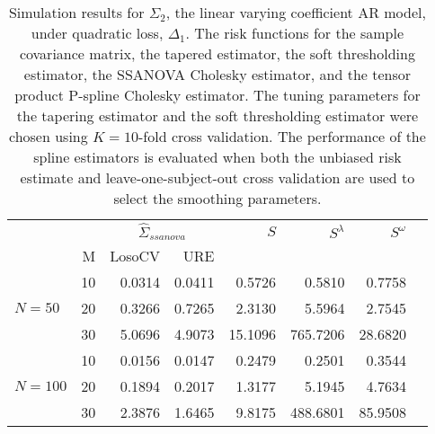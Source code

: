\documentclass[12pt]{article}
\theoremstyle{definition}
\begin{document}

\begin{table}[H]
\centering
\caption{Simulation results for $\Sigma_2$, the  linear varying coefficient AR model, under quadratic loss, $\Delta_1$. The risk functions for the sample covariance matrix, the tapered estimator, the soft thresholding estimator, the SSANOVA Cholesky estimator, and the tensor product P-spline Cholesky estimator. The tuning parameters for the tapering estimator and the soft thresholding estimator were chosen using $K = 10$-fold cross validation. The performance of the spline estimators is evaluated when both the unbiased risk estimate and leave-one-subject-out cross validation are used to select the smoothing parameters.}
\begin{tabular}{l|r|rrrrrr}
&  & \multicolumn{2}{c}{$\hat{\Sigma}_{ssanova}$} & $S$ & $S^\lambda$ & $S^\omega$ \\ 
&M & \mbox{LosoCV} & \mbox{URE} &  \\ 
  \hline
&    10 & 0.0314 &  0.0411	&0.5726  & 0.5810 & 0.7758\\ 
$N = 50 $ &    20 & 0.3266 & 0.7265	& 2.3130   & 5.5964 & 2.7545  \\ 
 &    30 & 5.0696 &  4.9073	 &15.1096 & 765.7206 & 28.6820  \\ \hdashline
 &    10 & 0.0156 &  0.0147	& 0.2479  & 0.2501 & 0.3544 \\ 
$N = 100$ &    20 & 0.1894 &  0.2017	 &1.3177 & 5.1945 & 4.7634 \\ 
  &    30 & 2.3876 &	1.6465  & 9.8175 & 488.6801 & 85.9508\\ 
\end{tabular}
\end{table}
\end{document}
